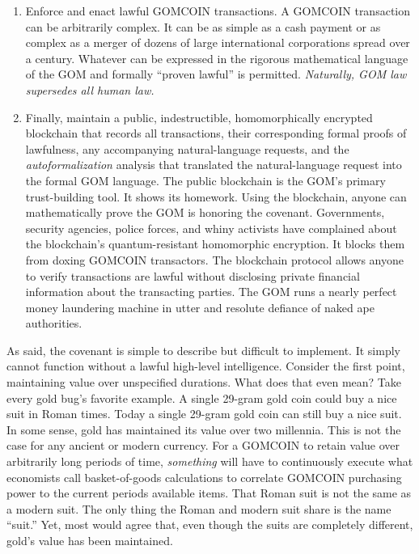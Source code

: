 \begin{enumerate}
  legal fictions like corporations and governments cannot. Of course,
  AIs, many robots, and even some animals like Sperm Whales can also
  pass Turing Tests. This has led to some delightful consequences like
  cetaceans using their lawfully accrued GOMCOIN holdings to sue world
  governments for ``whaling reparations.'' And why not? Whaling is
  arguably a more monstrous crime than human slavery.
\item
  Enforce and enact lawful GOMCOIN transactions. A GOMCOIN
  transaction can be arbitrarily complex. It can be as simple as a cash
  payment or as complex as a merger of dozens of large international
  corporations spread over a century. Whatever can be expressed in the
  rigorous mathematical language of the GOM and formally ``proven
  lawful'' is permitted. \emph{Naturally, GOM law supersedes all human law.}
\item
  Finally, maintain a public, indestructible, homomorphically encrypted
  blockchain that records all transactions, their corresponding formal
  proofs of lawfulness, any accompanying natural-language requests, and
  the \emph{autoformalization} analysis that translated the
  natural-language request into the formal GOM language. The public
  blockchain is the GOM's primary trust-building tool. It shows its
  homework. Using the blockchain, anyone can mathematically prove the
  GOM is honoring the covenant. Governments, security agencies, police
  forces, and whiny activists have complained about the blockchain's
  quantum-resistant homomorphic encryption. It blocks them from doxing
  GOMCOIN transactors. The blockchain protocol allows anyone to verify
  transactions are lawful without disclosing private financial
  information about the transacting parties. The GOM runs a nearly
  perfect money laundering machine in utter and resolute defiance of
  naked ape authorities.
\end{enumerate}

As said, the covenant is simple to describe but difficult to implement.
It simply cannot function without a lawful high-level intelligence.
Consider the first point, maintaining value over unspecified durations.
What does that even mean? Take every gold bug's favorite example. A
single 29-gram gold coin could buy a nice suit in Roman times. Today a
single 29-gram gold coin can still buy a nice suit. In some sense, gold
has maintained its value over two millennia. This is not the case for
any ancient or modern currency. For a GOMCOIN to retain value over
arbitrarily long periods of time, \emph{something} will have to
continuously execute what economists call basket-of-goods calculations
to correlate GOMCOIN purchasing power to the current
period\textquotesingle s available items. That Roman suit is not the
same as a modern suit. The only thing the Roman and modern suit share is
the name ``suit.'' Yet, most would agree that, even though the suits are
completely different, gold's value has been maintained.

